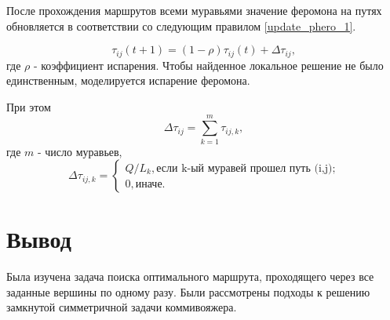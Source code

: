 После прохождения маршрутов всеми муравьями значение феромона на путях обновляется в соответствии со следующим правилом \eqref{update_phero_1}.

\begin{equation}
	\label{update_phero_1}
		\tau_{ij}(t+1) = (1-\rho)\tau_{ij}(t) + \Delta \tau_{ij},
\end{equation}
где $\rho$ - коэффициент испарения. Чтобы найденное локальное решение не было единственным, моделируется испарение феромона.

При этом
\begin{equation}
\label{update_phero_2}
 \Delta \tau_{ij} = \sum_{k=1}^m \tau_{ij, k},
\end{equation}
где $m$ - число муравьев,
\begin{equation}
	\label{update_phero_3}
		 \Delta\tau_{ij,k} = \begin{cases}
		Q/L_{k}, \textrm{если k-ый муравей прошел путь (i,j);} \\
		0, \textrm{иначе.}
	\end{cases}
\end{equation}

\section*{Вывод}

Была изучена задача поиска оптимального маршрута, проходящего через все заданные вершины по одному разу. Были рассмотрены подходы к решению замкнутой симметричной задачи коммивояжера.